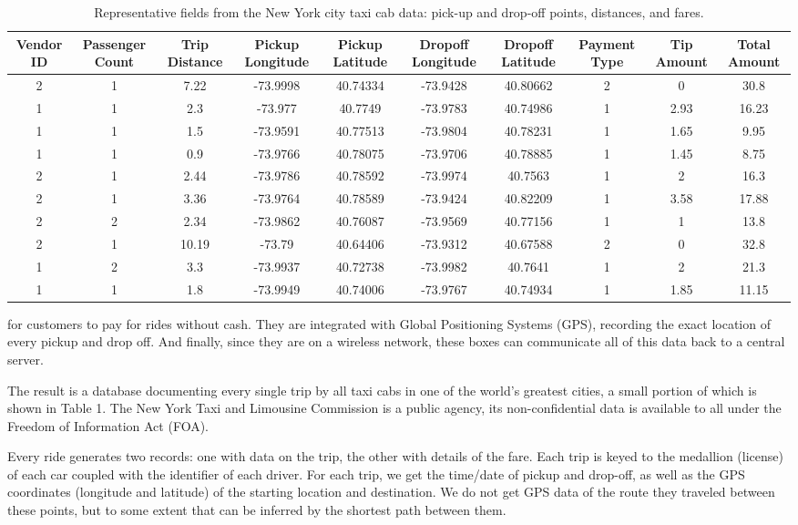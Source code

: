 \documentclass[10pt]{article}
\begin{document}
\begin{table}[h]
\centering
\begin{tabular}{|c|c|c|c|c|c|c|c|c|c|}
\hline
Vendor ID & Passenger Count & Trip Distance & Pickup Longitude & Pickup Latitude & Dropoff Longitude & Dropoff Latitude & Payment Type & Tip Amount & Total Amount \\
\hline
2 & 1 & 7.22 & -73.9998 & 40.74334 & -73.9428 & 40.80662 & 2 & 0 & 30.8 \\
1 & 1 & 2.3 & -73.977 & 40.7749 & -73.9783 & 40.74986 & 1 & 2.93 & 16.23 \\
1 & 1 & 1.5 & -73.9591 & 40.77513 & -73.9804 & 40.78231 & 1 & 1.65 & 9.95 \\
1 & 1 & 0.9 & -73.9766 & 40.78075 & -73.9706 & 40.78885 & 1 & 1.45 & 8.75 \\
2 & 1 & 2.44 & -73.9786 & 40.78592 & -73.9974 & 40.7563 & 1 & 2 & 16.3 \\
2 & 1 & 3.36 & -73.9764 & 40.78589 & -73.9424 & 40.82209 & 1 & 3.58 & 17.88 \\
2 & 2 & 2.34 & -73.9862 & 40.76087 & -73.9569 & 40.77156 & 1 & 1 & 13.8 \\
2 & 1 & 10.19 & -73.79 & 40.64406 & -73.9312 & 40.67588 & 2 & 0 & 32.8 \\
1 & 2 & 3.3 & -73.9937 & 40.72738 & -73.9982 & 40.7641 & 1 & 2 & 21.3 \\
1 & 1 & 1.8 & -73.9949 & 40.74006 & -73.9767 & 40.74934 & 1 & 1.85 & 11.15 \\
\hline
\end{tabular}
\caption{Representative fields from the New York city taxi cab data: pick-up and drop-off points, distances, and fares.}
\end{table}

for customers to pay for rides without cash. They are integrated with Global Positioning Systems (GPS), recording the exact location of every pickup and drop off. And finally, since they are on a wireless network, these boxes can communicate all of this data back to a central server.

The result is a database documenting every single trip by all taxi cabs in one of the world's greatest cities, a small portion of which is shown in Table 1. The New York Taxi and Limousine Commission is a public agency, its non-confidential data is available to all under the Freedom of Information Act (FOA).

Every ride generates two records: one with data on the trip, the other with details of the fare. Each trip is keyed to the medallion (license) of each car coupled with the identifier of each driver. For each trip, we get the time/date of pickup and drop-off, as well as the GPS coordinates (longitude and latitude) of the starting location and destination. We do not get GPS data of the route they traveled between these points, but to some extent that can be inferred by the shortest path between them.
\end{document}
